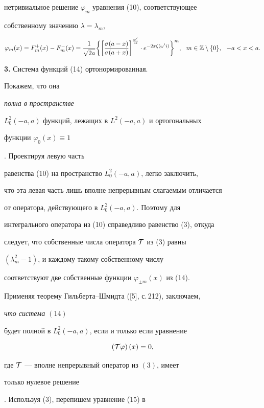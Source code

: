 нетривиальное решение $\varphi_{m}$ уравнения (10), соответствующее


собственному значению $\lambda=\lambda_{m}$,


\begin{equation}


\varphi_{m}(x)=F^{+}_{m}(x)-F^{-}_{m}(x)=


\dfrac{1}{\sqrt{2a}}\bigg\{


\bigg[\dfrac{\sigma(a-x)}{\sigma(a+x)}\bigg]


^{\frac{\omega'}{ai}}\cdot e^{-2x\zeta(\omega'


i)}\bigg\}^{m},\ \ m\in \Bbb{Z}\setminus\{0\},


\ \ -a<x<a.


\end{equation}





{\bf 3.} Система функций (14) ортонормированная.


Покажем, что она {\it полна в пространстве


$L^{2}_{0}(-a,a)$ функций, лежащих в $L^{2}(-a,a)$ и ортогональных


функции $\varphi_{0}(x)\equiv 1$}. Проектируя левую часть


равенства (10) на пространство $L^{2}_{0}(-a,a)$, легко заключить,


что эта левая часть лишь вполне непрерывным слагаемым отличается


от оператора, действующего в $L^{2}_{0}(-a,a)$. Поэтому для


интегрального оператора из (10) справедливо равенство (3), откуда


следует, что собственные числа оператора $\cal{T}$ из (3) равны


$(\lambda^{2}_{m}-1)$, и каждому такому собственному числу


соответствуют две собственные функции $\varphi_{\pm m}(x)$ из (14).


Применяя теорему Гильберта--Шмидта ([5], с.\,212), заключаем,


{\it что система $(14)$


будет полной в $L^{2}_{0}(-a,a)$, если и только если уравнение


\begin{equation}


\left(\cal{T}\varphi\right)(x)=0,


\end{equation}


где $\cal{T}$ --- вполне непрерывный оператор из $(3)$, имеет


только нулевое решение}. Используя (3), перепишем уравнение (15) в



